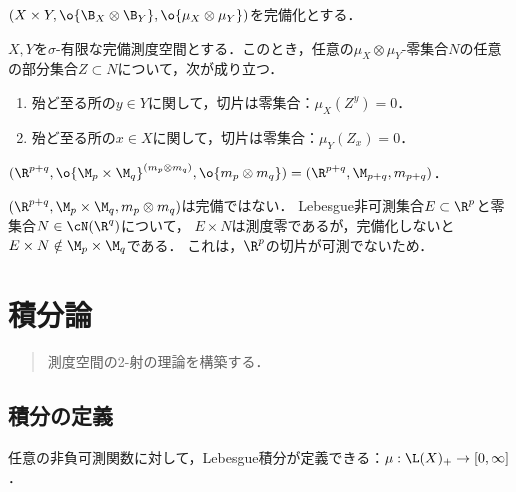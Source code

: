 \documentclass[uplatex, dvipdfmx]{jsreport}
\begin{document}
\begin{notation}
    $(X\times Y,\o{\B_X\otimes\B_Y},\o{\mu_X\otimes\mu_Y})$を完備化とする．
\end{notation}

\begin{theorem}[零集合の違いを除いて同様の消息が成り立つ]
    $X,Y$を$\sigma$-有限な完備測度空間とする．このとき，任意の$\mu_X\otimes\mu_Y$-零集合$N$の任意の部分集合$Z\subset N$について，次が成り立つ．
    \begin{enumerate}
        \item 殆ど至る所の$y\in Y$に関して，切片は零集合：$\mu_X(Z^y)=0$．
        \item 殆ど至る所の$x\in X$に関して，切片は零集合：$\mu_Y(Z_x)=0$．
    \end{enumerate}
\end{theorem}

\begin{theorem}[Lebesgue測度の直積の完備化はLebesgue測度である]
    $(\R^{p+q},\o{\M_p\times\M_q}^{(m_p\otimes m_q)},\o{m_p\otimes m_q})=(\R^{p+q},\M_{p+q},m_{p+q})$．
\end{theorem}
\begin{example}
    $(\R^{p+q},\M_p\times\M_q,m_p\otimes m_q)$は完備ではない．
    Lebesgue非可測集合$E\subset\R^p$と零集合$N\in\cN(\R^q)$について，
    $E\times N$は測度零であるが，完備化しないと$E\times N\notin\M_p\times\M_q$である．
    これは，$\R^p$の切片が可測でないため．
\end{example}

\chapter{積分論}

\begin{quotation}
    測度空間の2-射の理論を構築する．
\end{quotation}

\section{積分の定義}

\begin{tcolorbox}[colframe=ForestGreen, colback=ForestGreen!10!white,breakable,colbacktitle=ForestGreen!40!white,coltitle=black,fonttitle=\bfseries\sffamily,
title=]
    任意の非負可測関数に対して，Lebesgue積分が定義できる：$\mu:\L(X)_+\to[0,\infty]$．

\end{tcolorbox}
\end{document}
